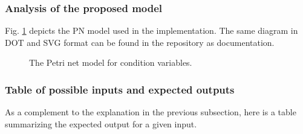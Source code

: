 \subsubsection{Analysis of the proposed model}

Fig. \ref{fig:condition-variable-model} depicts
the \acrshort{PN} model used in the implementation.
The same diagram in DOT and SVG format
can be found in the repository as documentation.

\begin{figure}[!htbp]
      \centering
      
      \caption{The Petri net model for condition variables.}
      \label{fig:condition-variable-model}
\end{figure}

\subsubsection{Table of possible inputs and expected outputs}

As a complement to the explanation in the previous subsection,
here is a table summarizing the expected output for a given input.

